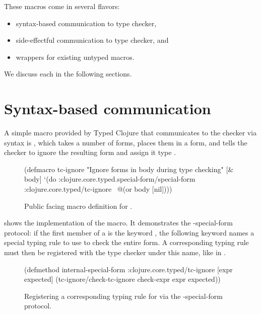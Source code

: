 These macros come in several flavors:

\begin{itemize}
  \item syntax-based communication to type checker,
  \item side-effectful communication to type checker, and
  \item wrappers for existing untyped macros.
\end{itemize}

We discuss each in the following sections.

\section{Syntax-based communication}

A simple macro provided by Typed Clojure that communicates to the checker
via syntax is , which takes a number of forms, places
them in a  form, and tells the checker to ignore the resulting
form and assign it type .

\begin{figure*}
\begin{cljlisting}
(defmacro tc-ignore 
  "Ignore forms in body during type checking"
  [& body]
  `(do :clojure.core.typed.special-form/special-form
       :clojure.core.typed/tc-ignore
       ~@(or body [nil])))
\end{cljlisting}
  \caption{Public facing macro definition for .}
  \label{fig:analyzer:tc-ignore}
\end{figure*}

 shows the implementation of the  macro.
It demonstrates the -special-form protocol:
if the first member of a  is the keyword
,
the following keyword names a special typing rule to use
to check the entire form.
A corresponding typing rule must then be registered with the type checker under this name,
like in .

\begin{figure*}
\begin{cljlisting}
(defmethod internal-special-form :clojure.core.typed/tc-ignore
  [expr expected]
  (tc-ignore/check-tc-ignore check-expr expr expected))
\end{cljlisting}
  \caption{Registering a corresponding typing rule for  via the -special-form protocol.}
  \label{fig:analyzer:tc-ignore-do-op}
\end{figure*}

